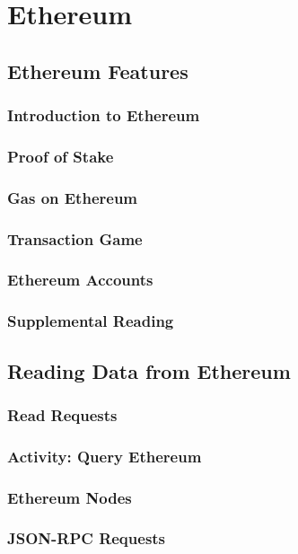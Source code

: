 \documentclass[a4paper, oneside]{book}
\begin{document}
\chapter{Ethereum}

\section{Ethereum Features}
\subsection{Introduction to Ethereum}
\subsection{Proof of Stake}
\subsection{Gas on Ethereum}
\subsection{Transaction Game}
\subsection{Ethereum Accounts}
\subsection{Supplemental Reading}

\section{Reading Data from Ethereum}
\subsection{Read Requests}
\subsection{Activity: Query Ethereum}
\subsection{Ethereum Nodes}
\subsection{JSON-RPC Requests}
\end{document}
